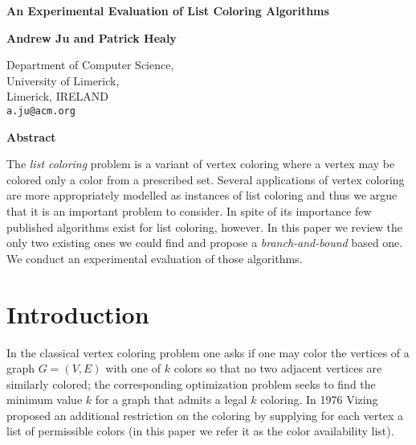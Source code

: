\documentclass[10pt]{article}
\begin{document}
\newcommand{\NP}{N\!P}
\newcommand{\Vh}{V_h}
\newcommand{\Eh}{E_h}
\newcommand{\Vl}{V_l}
\newcommand{\El}{E_l}
\newcommand{\Vs}{V_s}
\newcommand{\Vt}{V_t}
\newcommand{\Vi}{V_i}
\newcommand{\card}[1]{|#1|}
\newcommand{\outd}[1]{d^+(#1)}
\newcommand{\ind}[1]{d^-(#1)}
\renewcommand{\th}{\mbox{$^{\scriptstyle {\rm th}}$}}
\newtheorem{mydef}{Definition}
\pagestyle{empty}
\vspace*{10mm}

\begin{center}
 {\Large \bf An Experimental Evaluation of List Coloring Algorithms}

\vspace{7mm}

 {\large \bf Andrew Ju and Patrick Healy\\}

\vspace{1mm}
 {\large Department of Computer Science,\\
  University of Limerick, \\Limerick, IRELAND\\
  \texttt{a.ju@acm.org}\\}
\end{center}

\vspace{.1cm}
\noindent
  \begin{center}
  \textbf{Abstract}
  \end{center}
  
  The \emph{list coloring} problem is a variant of vertex coloring where
  a vertex may be colored only a color from a prescribed set.  Several
  applications of vertex coloring are more appropriately modelled as
  instances of list coloring and thus we argue that it is an important
  problem to consider.  In spite of its importance few published
  algorithms exist for list coloring, however.  In this paper we review
  the only two existing ones we could find and propose a \textit{branch-and-bound} 
  based one.  We conduct an experimental evaluation of those algorithms.

\section{Introduction}\label{sec:intro}

In the classical vertex coloring problem one asks if one may color the
vertices of a graph $G = (V, E)$ with one of $k$ colors so that no two adjacent
vertices are similarly colored; the corresponding optimization problem
seeks to find the minimum value $k$ for a graph that admits a legal $k$
coloring.  In 1976 Vizing~\cite{vizing-76:list-col} proposed an
additional restriction on the coloring by supplying for each vertex a
list of permissible colors (in this paper we refer it as the color availability list).
\end{document}
